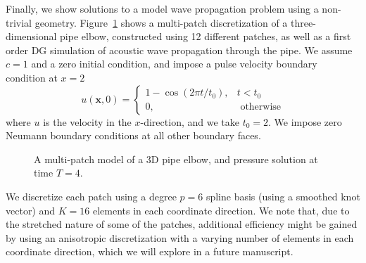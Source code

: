 \documentclass[preprint,10pt]{elsarticle}
\newcommand{\note}[1]{{\color{blue}{#1}}}
\begin{document}
Finally, we show solutions to a model wave propagation problem using a non-trivial geometry.  Figure~\ref{fig:pipe3D} shows a multi-patch discretization of a three-dimensional pipe elbow, constructed using 12 different patches, as well as a first order DG simulation of acoustic wave propagation through the pipe.  We assume $c = 1$ and a zero initial condition, and impose a pulse velocity boundary condition at $x=2$
\[
u(\bm{x},0) = \begin{cases}
1-\cos(2\pi t /t_0), &t < t_0\\
0, &\text{ otherwise}
\end{cases}
\]
where $u$ is the velocity in the $x$-direction, and we take $t_0 = 2$.  We impose zero Neumann boundary conditions at all other boundary faces.  

\begin{figure}
\centering
{}
\caption{A multi-patch model of a 3D pipe elbow, and pressure solution at time $T = 4$. }
\label{fig:pipe3D}
\end{figure}

We discretize each patch using a degree $p=6$ spline basis (using a smoothed knot vector) and $K = 16$ elements in each coordinate direction.  We note that, due to the stretched nature of some of the patches, additional efficiency might be gained by using an anisotropic discretization with a varying number of elements in each coordinate direction, which we will explore in a future manuscript.  
\end{document}

